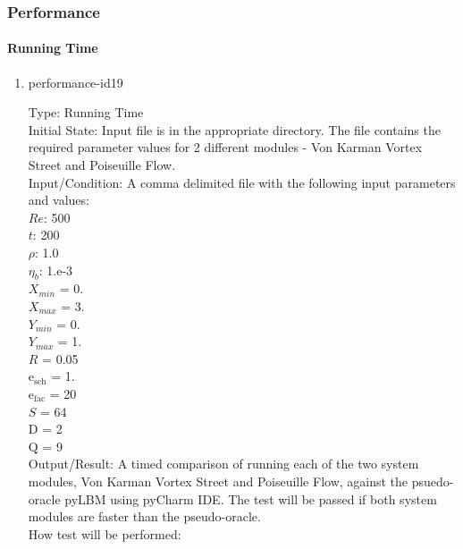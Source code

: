 \documentclass[12pt, titlepage]{article}
\begin{document}
\subsubsection{Performance}
		
\paragraph{Running Time}

\begin{enumerate}

\item{performance-id19\\}

Type: Running Time\\
					
Initial State: Input file is in the appropriate directory. The file contains the required parameter values for 2 different modules - Von Karman Vortex Street and Poiseuille Flow.\\
					
Input/Condition: A comma delimited file with the following input parameters and values:\\
$Re$: 500\\
$t$: 200\\
$\rho$: 1.0\\
$\eta_b$: 1.e-3\\
$X_{min}$ = 0.\\
$X_{max}$ = 3.\\
$Y_{min}$ = 0.\\
$Y_{max}$ = 1.\\
$R$ = 0.05\\
$\mathrm{e_{sch}}$ = 1.\\
$\mathrm{e_{fac}}$ = 20\\
$S$ = 64\\
$\mathrm{D}$ = 2\\
$\mathrm{Q}$ = 9\\
					
Output/Result: A timed comparison of running
each of the two system modules, Von Karman Vortex Street and Poiseuille Flow, against the psuedo-oracle pyLBM using pyCharm IDE. The test will be passed if both system modules are faster than the pseudo-oracle.\\

How test will be performed: 


\end{enumerate}
\end{document}
